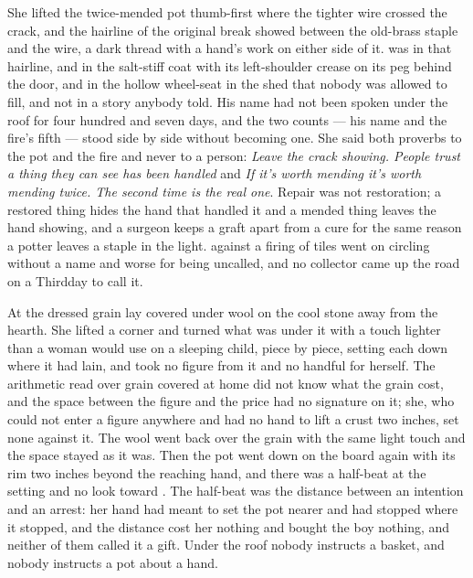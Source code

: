 She lifted the twice-mended pot thumb-first where the tighter wire crossed the crack, and the hairline of the original break showed between the old-brass staple and the wire, a dark thread with a hand's work on either side of it.  was in that hairline, and in the salt-stiff coat with its left-shoulder crease on its peg behind the door, and in the hollow wheel-seat in the shed that nobody was allowed to fill, and not in a story anybody told. His name had not been spoken under the roof for four hundred and seven days, and the two counts --- his name and the fire's fifth --- stood side by side without becoming one. She said both proverbs to the pot and the fire and never to a person: \emph{Leave the crack showing. People trust a thing they can see has been handled} and \emph{If it's worth mending it's worth mending twice. The second time is the real one}. Repair was not restoration; a restored thing hides the hand that handled it and a mended thing leaves the hand showing, and a surgeon keeps a graft apart from a cure for the same reason a potter leaves a staple in the light.  against a firing of tiles went on circling without a name and worse for being uncalled, and no collector came up the road on a Thirdday to call it.

At  the dressed grain lay covered under wool on the cool stone away from the hearth. She lifted a corner and turned what was under it with a touch lighter than a woman would use on a sleeping child, piece by piece, setting each down where it had lain, and took no figure from it and no handful for herself. The arithmetic read over grain covered at home did not know what the grain cost, and the space between the figure and the price had no signature on it; she, who could not enter a figure anywhere and had no hand to lift a crust two inches, set none against it. The wool went back over the grain with the same light touch and the space stayed as it was. Then the pot went down on the board again with its rim two inches beyond the reaching hand, and there was a half-beat at the setting and no look toward . The half-beat was the distance between an intention and an arrest: her hand had meant to set the pot nearer and had stopped where it stopped, and the distance cost her nothing and bought the boy nothing, and neither of them called it a gift. Under the roof nobody instructs a basket, and nobody instructs a pot about a hand.


